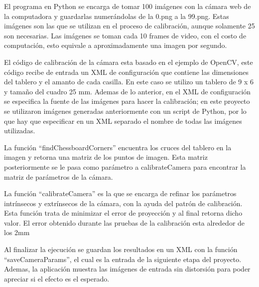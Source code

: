 El programa en Python se encarga de tomar 100 imágenes con la cámara
web de la computadora y guardarlas numerándolas de la 0.png a la 99.png.
Estas imágenes son las que se utilizan en el proceso de calibración,
aunque solamente 25 son necesarias. Las imágenes se toman cada 10
frames de video, con el costo de computación, esto equivale a aproximadamente
una imagen por segundo.

El código de calibración de la cámara esta basado en el ejemplo de
OpenCV, este código recibe de entrada un XML de configuración que
contiene las dimensiones del tablero y el amanto de cada casilla.
En este caso se utilizo un tablero de 9 x 6 y tamaño del cuadro 25
mm. Ademas de lo anterior, en el XML de configuración se especifica
la fuente de las imágenes para hacer la calibración; en este proyecto
se utilizaron imágenes generadas anteriormente con un script de Python,
por lo que hay que especificar en un XML separado el nombre de todas
las imágenes utilizadas.

La función \textquotedblleft findChessboardCorners\textquotedblright{}
encuentra los cruces del tablero en la imagen y retorna una matriz
de los puntos de imagen. Esta matriz posteriormente se le pasa como
parámetro a calibrateCamera para encontrar la matriz de parámetros
de la cámara.

La función \textquotedblleft calibrateCamera\textquotedblright{} es
la que se encarga de refinar los parámetros intrínsecos y extrínsecos
de la cámara, con la ayuda del patrón de calibración. Esta función
trata de minimizar el error de proyección y al final retorna dicho
valor. El error obtenido durante las pruebas de la calibración esta
alrededor de los 2mm

Al finalizar la ejecución se guardan los resultados en un XML con
la función \textquotedblleft saveCameraParams\textquotedblright ,
el cual es la entrada de la siguiente etapa del proyecto. Ademas,
la aplicación muestra las imágenes de entrada sin distorsión para
poder apreciar si el efecto es el esperado.
